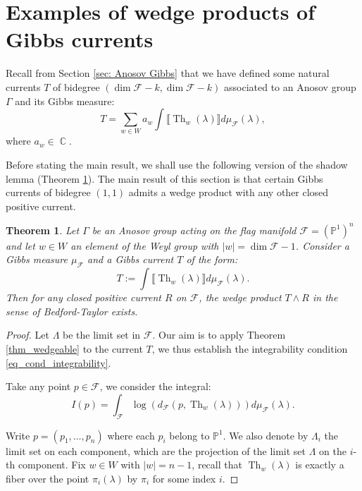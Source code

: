 \documentclass[12pt]{amsbook}%
\newtheorem{thm}{Theorem}[chapter]
\theoremstyle{definition}
\theoremstyle{remark}
\numberwithin{section}{chapter}
\numberwithin{subsection}{section}
\numberwithin{figure}{chapter}
\DeclareMathOperator{\C}{\mathbb{C}}
\DeclareMathOperator{\Th}{Th}
\def\bP{{\mathbb{P}}}
\def\cF{{\mathscr{F}}}
\def\Ga{\Gamma}
\begin{document}
{{\section{Examples of wedge products of Gibbs currents}


Recall from Section \ref{sec: Anosov Gibbs} that we have defined some natural currents $T$ of bidegree $(\dim \cF -k , \dim \cF - k)$ associated to an Anosov group $\Ga$ and its Gibbs measure:  
\begin{equation}
T = \sum_{w \in W} a_w \int \llbracket \Th_w(\lambda ) \rrbracket d\mu_{\cF}(\lambda),
\end{equation}
where 
$a_w \in \C$.

Before stating the main result, we shall use the following version of the shadow lemma (Theorem \ref{thm:shad}). 
The main result of this section is that certain Gibbs currents of  bidegree $(1,1)$ admits a wedge product with any other closed positive current.  

\begin{thm} \label{thm:shad}
Let $\Ga$ be an Anosov group  acting on the flag manifold $\cF= (\bP^1)^n$ and let $w \in W$ an element of the Weyl group with $|w| = \dim \cF-1$. 
Consider a Gibbs measure $\mu_{\cF}$ and a Gibbs current $T$ of the form: 
\begin{equation*}
T:= \int \llbracket \Th_w(\lambda) \rrbracket d\mu_{\cF}(\lambda).
\end{equation*}
Then for any closed positive current $R$ on $\cF$, the wedge product $T\wedge R$ in the sense of Bedford-Taylor exists.  
\end{thm}

\begin{proof} Let $\Lambda$ be the limit set in $\cF$. 
Our aim is to apply  Theorem \ref{thm_wedgeable} to the current $T$, we thus establish the integrability condition \eqref{eq_cond_integrability}. 

Take any point $p\in \cF$, we consider the integral: 
\begin{equation*}
I(p) = \int_{\cF} \log (d_{\cF}(p,\Th_w(\lambda))) d\mu_{\cF}(\lambda) . 
\end{equation*}

Write $p = (p_1,\ldots, p_n)$ where each $p_i$ belong to $\bP^1$. 
We also denote by $\Lambda_i$ the limit set on each component, which are the projection of the limit set $\Lambda$ on the $i$-th component. Fix $w\in W$ with $|w|= n-1$, recall that $\Th_w(\lambda)$ is exactly a fiber over the point $\pi_i(\lambda)$ by $\pi_i$ for some index $i$. 


\end{proof}}}
\end{document}
